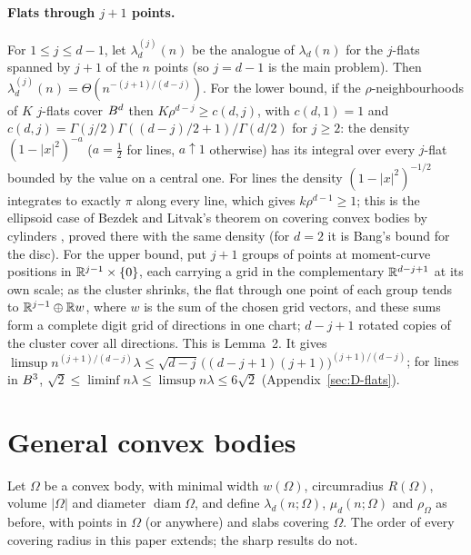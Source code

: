 \documentclass[11pt]{article}
\begin{document}
\paragraph{Flats through $j+1$ points.} For $1\le j\le d-1$, let $\lambda_d^{(j)}(n)$ be the analogue of
$\lambda_d(n)$ for the $j$-flats spanned by $j+1$ of the $n$ points (so $j=d-1$ is the main problem).
Then $\lambda_d^{(j)}(n)=\Theta(n^{-(j+1)/(d-j)})$. For the lower bound, if the $\rho$-neighbourhoods of
$K$ $j$-flats cover $B^d$ then $K\rho^{d-j}\ge c(d,j)$, with $c(d,1)=1$ and
$c(d,j)=\Gamma(j/2)\Gamma((d-j)/2+1)/\Gamma(d/2)$ for $j\ge2$: the density $(1-|x|^2)^{-a}$ ($a=\frac12$
for lines, $a\uparrow1$ otherwise) has its integral over every $j$-flat bounded by the value on a
central one. For lines the density $(1-|x|^2)^{-1/2}$ integrates to exactly $\pi$ along every line,
which gives $k\rho^{d-1}\ge1$; this is the ellipsoid case of Bezdek and Litvak's theorem on covering
convex bodies by cylinders \cite{BL}, proved there with the same density (for $d=2$ it is Bang's bound
for the disc). For the upper bound, put $j+1$ groups of points at moment-curve positions in
$\mathbb{R}^{j-1}\times\{0\}$, each carrying a grid in the complementary $\mathbb{R}^{d-j+1}$ at its own scale; as the
cluster shrinks, the flat through one point of each group tends to $\mathbb{R}^{j-1}\oplus\mathbb{R} w$, where $w$ is
the sum of the chosen grid vectors, and these sums form a complete digit grid of directions in one chart; $d-j+1$ rotated copies of the
cluster cover all directions. This is
Lemma~2. It gives
$\limsup n^{(j+1)/(d-j)}\lambda\le\sqrt{d-j}\,\bigl((d-j+1)(j+1)\bigr)^{(j+1)/(d-j)}$; for lines in
$B^3$, $\sqrt2\le\liminf n\lambda\le\limsup n\lambda\le6\sqrt2$ (Appendix~\ref{sec:D-flats}).

\section{General convex bodies}\label{sec:convex}

Let $\Omega$ be a convex body, with minimal width $w(\Omega)$, circumradius $R(\Omega)$, volume $|\Omega|$
and diameter $\operatorname{diam}\Omega$, and define $\lambda_d(n;\Omega)$, $\mu_d(n;\Omega)$ and
$\rho_\Omega$ as before, with points in $\Omega$ (or anywhere) and slabs covering $\Omega$. The order of every
covering radius in this paper extends; the sharp results do not.
\end{document}
